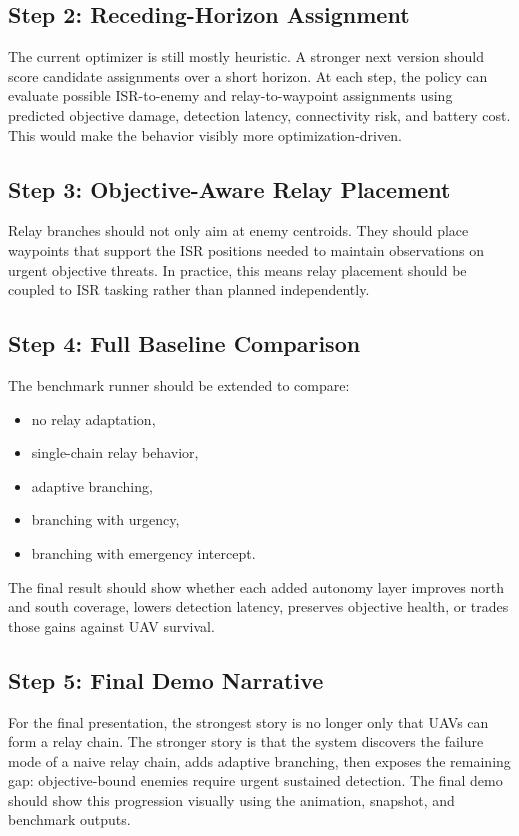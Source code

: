 \documentclass[conference]{IEEEtran}
\begin{document}
\subsection{Step 2: Receding-Horizon Assignment}
The current optimizer is still mostly heuristic. A stronger next version should
score candidate assignments over a short horizon. At each step, the policy can
evaluate possible ISR-to-enemy and relay-to-waypoint assignments using predicted
objective damage, detection latency, connectivity risk, and battery cost. This
would make the behavior visibly more optimization-driven.

\subsection{Step 3: Objective-Aware Relay Placement}
Relay branches should not only aim at enemy centroids. They should place
waypoints that support the ISR positions needed to maintain observations on
urgent objective threats. In practice, this means relay placement should be
coupled to ISR tasking rather than planned independently.

\subsection{Step 4: Full Baseline Comparison}
The benchmark runner should be extended to compare:
\begin{itemize}
    \item no relay adaptation,
    \item single-chain relay behavior,
    \item adaptive branching,
    \item branching with urgency,
    \item branching with emergency intercept.
\end{itemize}
The final result should show whether each added autonomy layer improves north
and south coverage, lowers detection latency, preserves objective health, or
trades those gains against UAV survival.

\subsection{Step 5: Final Demo Narrative}
For the final presentation, the strongest story is no longer only that UAVs can
form a relay chain. The stronger story is that the system discovers the failure
mode of a naive relay chain, adds adaptive branching, then exposes the remaining
gap: objective-bound enemies require urgent sustained detection. The final demo
should show this progression visually using the animation, snapshot, and
benchmark outputs.
\end{document}
